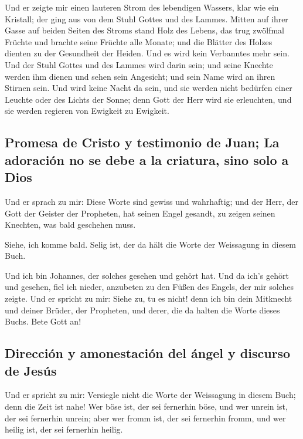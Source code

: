  Und er zeigte mir einen lauteren Strom des lebendigen
Wassers, klar wie ein Kristall; der ging aus von dem Stuhl Gottes und
des Lammes.  Mitten auf ihrer Gasse auf beiden Seiten des
Stroms stand Holz des Lebens, das trug zwölfmal Früchte und brachte
seine Früchte alle Monate; und die Blätter des Holzes dienten zu der
Gesundheit der Heiden.  Und es wird kein Verbanntes mehr
sein. Und der Stuhl Gottes und des Lammes wird darin sein; und seine
Knechte werden ihm dienen  und sehen sein Angesicht; und
sein Name wird an ihren Stirnen sein.  Und wird keine
Nacht da sein, und sie werden nicht bedürfen einer Leuchte oder des
Lichts der Sonne; denn Gott der Herr wird sie erleuchten, und sie werden
regieren von Ewigkeit zu Ewigkeit.

\hypertarget{promesa-de-cristo-y-testimonio-de-juan-la-adoraciuxf3n-no-se-debe-a-la-criatura-sino-solo-a-dios}{%
\subsection{Promesa de Cristo y testimonio de Juan; La adoración no se
debe a la criatura, sino solo a
Dios}\label{promesa-de-cristo-y-testimonio-de-juan-la-adoraciuxf3n-no-se-debe-a-la-criatura-sino-solo-a-dios}}

 Und er sprach zu mir: Diese Worte sind gewiss und
wahrhaftig; und der Herr, der Gott der Geister der Propheten, hat seinen
Engel gesandt, zu zeigen seinen Knechten, was bald geschehen muss.

 Siehe, ich komme bald. Selig ist, der da hält die Worte
der Weissagung in diesem Buch.

 Und ich bin Johannes, der solches gesehen und gehört hat.
Und da ich's gehört und gesehen, fiel ich nieder, anzubeten zu den Füßen
des Engels, der mir solches zeigte.  Und er spricht zu
mir: Siehe zu, tu es nicht! denn ich bin dein Mitknecht und deiner
Brüder, der Propheten, und derer, die da halten die Worte dieses Buchs.
Bete Gott an!

\hypertarget{direcciuxf3n-y-amonestaciuxf3n-del-uxe1ngel-y-discurso-de-jesuxfas}{%
\subsection{Dirección y amonestación del ángel y discurso de
Jesús}\label{direcciuxf3n-y-amonestaciuxf3n-del-uxe1ngel-y-discurso-de-jesuxfas}}

 Und er spricht zu mir: Versiegle nicht die Worte der
Weissagung in diesem Buch; denn die Zeit ist nahe!  Wer
böse ist, der sei fernerhin böse, und wer unrein ist, der sei fernerhin
unrein; aber wer fromm ist, der sei fernerhin fromm, und wer heilig ist,
der sei fernerhin heilig.

